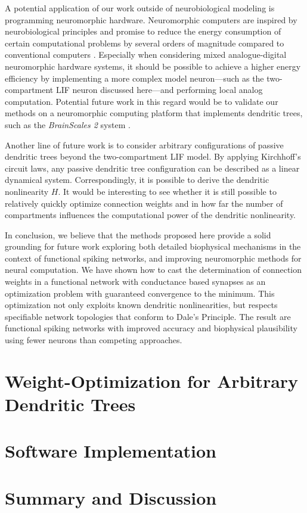 A potential application of our work outside of neurobiological modeling is programming neuromorphic hardware. Neuromorphic computers are inspired by neurobiological principles and promise to reduce the energy consumption of certain computational problems by several orders of magnitude compared to conventional computers \citep{boahen2017neuromorph}. Especially when considering mixed analogue-digital neuromorphic hardware systems, it should be possible to achieve a higher energy efficiency by implementing a more complex model neuron---such as the two-compartment LIF neuron discussed here---and performing local analog computation. Potential future work in this regard would be to validate our methods on a neuromorphic computing platform that implements dendritic trees, such as the \emph{BrainScales 2} system \citep{schemmel2017accelerated}.

Another line of future work is to consider arbitrary configurations of passive dendritic trees beyond the two-compartment LIF model. By applying Kirchhoff's circuit laws, any passive dendritic tree configuration can be described as a linear dynamical system. Correspondingly, it is possible to derive the dendritic nonlinearity $H$. It would be interesting to see whether it is still possible to relatively quickly optimize connection weights and in how far the number of compartments influences the computational power of the dendritic nonlinearity.

In conclusion, we believe that the methods proposed here provide a solid grounding for future work exploring both detailed biophysical mechanisms in the context of functional spiking networks, and improving neuromorphic methods for neural computation. We have shown how to cast the determination of connection weights in a functional network with conductance based synapses as an optimization problem with guaranteed convergence to the minimum. This optimization not only exploits known dendritic nonlinearities, but respects specifiable network topologies that conform to Dale's Principle. The result are functional spiking networks with improved accuracy and biophysical plausibility using fewer neurons than competing approaches.

\section{Weight-Optimization for Arbitrary Dendritic Trees}
\label{sec:nlif_opt}

\section{Software Implementation}

\section{Summary and Discussion}
